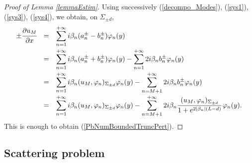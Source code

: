 \documentclass[11pt,a4paper]{report}
\newcommand{\dsp}{\displaystyle}
\begin{document}
\begin{proof}[Proof of Lemma \ref{lemmaEstim}]
Using successively (\ref{decompo_Modes}), (\ref{sys1}), (\ref{sys3}), (\ref{sys4}), we obtain, on $\Sigma_{\pm d}$,
\[
\begin{array}{rcl}
\pm\cfrac{\partial u_M}{\partial x}&=&\dsp\sum_{n=1}^{+\infty} i\beta_n (a^\pm_n-b^\pm_n)\varphi_n(y)\\[12pt]
&=&\dsp\sum_{n=1}^{+\infty} i\beta_n (a^\pm_n+b^\pm_n)\varphi_n(y)-\sum_{n=1}^{+\infty} 2i\beta_n b^\pm_n\varphi_n(y)\\[12pt]
&=&\dsp\sum_{n=1}^{+\infty} i\beta_n (u_M,\varphi_n)_{\Sigma_{\pm d}}\varphi_n(y)-\sum_{n=M+1}^{+\infty} 2i\beta_n b^\pm_n\varphi_n(y)\\[12pt]
&=&\dsp\sum_{n=1}^{+\infty} i\beta_n (u_M,\varphi_n)_{\Sigma_{\pm d}}\varphi_n(y)-\sum_{n=M+1}^{+\infty} 2i\beta_n \cfrac{(u_M,\varphi_n)_{\Sigma_{\pm d}}}{1+e^{2|\beta_n|(L-d)}}\,\varphi_n(y).
\end{array}
\]
This is enough to obtain (\ref{PbNumBoundedTruncPert}).
\end{proof}



\subsection{Scattering problem}\label{ParaScaPb}
\end{document}
